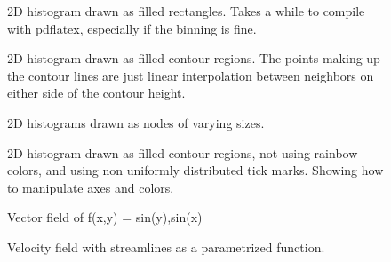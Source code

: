 \documentclass{article}
\begin{document}
\begin{figure}[H]
\centering

\captionsetup{singlelinecheck=off}
\caption[asdf]{2D histogram drawn as filled rectangles. Takes a while to compile with pdflatex, 
especially if the binning is fine.}
\end{figure}
\begin{figure}[H]
\centering

\captionsetup{singlelinecheck=off}
\caption[asdf]{2D histogram drawn as filled contour regions. The points making up the contour lines 
are just linear interpolation between neighbors on either side of the contour height.}
\end{figure}
\begin{figure}[H]
\centering

\captionsetup{singlelinecheck=off}
\caption[asdf]{2D histograms drawn as nodes of varying sizes.}
\end{figure}
\begin{figure}[H]
\centering

\captionsetup{singlelinecheck=off}
\caption[asdf]{2D histogram drawn as filled contour regions, not using rainbow colors, and using
non uniformly distributed tick marks. Showing how to manipulate axes and colors.}
\end{figure}
\begin{figure}[H]
\centering

\captionsetup{singlelinecheck=off}
\caption[asdf]{Vector field of f(x,y) = sin(y),sin(x)}
\end{figure}
\begin{figure}[H]
\centering

\captionsetup{singlelinecheck=off}
\caption[asdf]{Velocity field with streamlines as a parametrized function.}
\end{figure}
\end{document}
